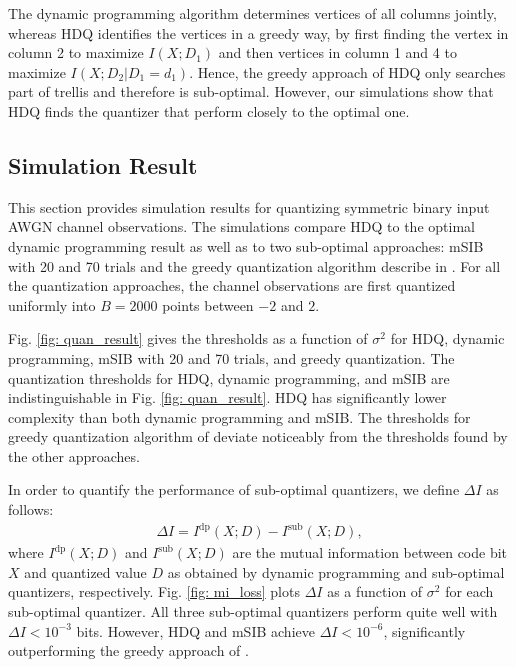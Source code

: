 \documentclass [PhD] {uclathes}
\begin{document}
The dynamic programming algorithm determines vertices of all columns jointly, whereas HDQ identifies the vertices in a greedy way, by first finding the vertex in column 2 to maximize $I(X;D_1)$ and then vertices in column 1 and 4 to maximize $I(X;D_2|D_1=d_1)$.  Hence, the greedy approach of HDQ only searches part of trellis and therefore is sub-optimal. However, our simulations show that HDQ finds the quantizer that perform closely to  the optimal one.




\subsection{Simulation Result}
This section provides simulation results for quantizing symmetric binary input AWGN channel observations. The simulations compare HDQ to the optimal dynamic programming result as well as to two sub-optimal approaches: mSIB with 20 and 70 trials and the greedy quantization algorithm describe in \cite{Lewandowsky2018-IBRegular}. For all the quantization approaches, the channel observations are first quantized uniformly into $B=2000$ points between $-2$ and $2$. 

Fig. \ref{fig: quan_result} gives the thresholds as a function of $\sigma^2$ for HDQ, dynamic programming, mSIB with 20 and 70 trials, and  greedy quantization.  The quantization thresholds for HDQ, dynamic programming, and mSIB are indistinguishable in Fig.  \ref{fig: quan_result}.  HDQ has significantly lower complexity than both dynamic programming and mSIB. The thresholds for greedy quantization algorithm of \cite{Tal2011-QuanVardy} deviate noticeably from the thresholds found by the other approaches.


In order to quantify the performance of sub-optimal quantizers, we define $\Delta I$ as follows:
\begin{align}
    \Delta I = I^{\text{dp}}(X;D)-I^{\text{sub}}(X;D),
\end{align}
where $I^{\text{dp}}(X;D)$ and $I^{\text{sub}}(X;D)$ are the mutual information between code bit $X$ and quantized value $D$ as obtained by dynamic programming and sub-optimal quantizers, respectively. Fig. \ref{fig: mi_loss} plots $\Delta I$ as a function of $\sigma^2$ for each sub-optimal quantizer.  All three sub-optimal quantizers perform quite well with $\Delta I < 10^{-3}$ bits.  However, HDQ and mSIB achieve  $\Delta I < 10^{-6}$, significantly outperforming the greedy approach of \cite{Tal2011-QuanVardy}.
\end{document}
